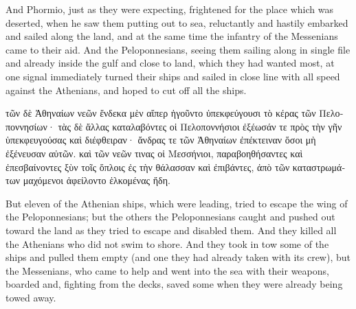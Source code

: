 \documentclass{article}
\begin{document}
And Phormio, just as they were expecting, frightened for the place which was deserted,
when he saw them putting out to sea, reluctantly and hastily embarked and sailed along the land,
and at the same time the infantry of the Messenians came to their aid.
And the Peloponnesians, seeing them sailing along in single file
and already inside the gulf and close to land, which they had wanted most,
at one signal immediately turned their ships
and sailed in close line with all speed against the Athenians,
and hoped to cut off all the ships. \\


\begin{greek}
τῶν δὲ Ἀθηναίων νεῶν ἕνδεκα μὲν αἵπερ ἡγοῦντο ὐπεκφεύγουσι τὸ κέρας τῶν Πελοποννησίων·
τὰς δὲ ἄλλας καταλαβόντες οἱ Πελοποννήσιοι ἐξέωσάν τε πρὸς τὴν γῆν ὑπεκφευγούσας καὶ διέφθειραν·
ἄνδρας τε τῶν Ἀθηναίων ἐπέκτειναν ὅσοι μὴ ἐξένευσαν αὐτῶν.
καὶ τῶν νεῶν τινας οἱ Μεσσήνιοι, παραβοηθήσαντες καὶ ἐπεσβαίνοντες ξὺν τοῖς ὅπλοις ἐς τὴν θάλασσαν καὶ ἐπιβάντες,
ἀπὸ τῶν καταστρωμάτων μαχόμενοι ἀφείλοντο ἑλκομένας ἤδη. \\
\end{greek}



But eleven of the Athenian ships, which were leading, tried to escape the wing of the Peloponnesians;
but the others the Peloponnesians caught and pushed out toward the land as they tried to escape and disabled  them.
And they killed all the Athenians who did not swim to shore.
And they took in tow some of the ships and pulled them empty (and one they had already taken with its crew),
but the Messenians, who came to help and went into the sea with their weapons,
boarded and, fighting from the decks, saved some when they were already being towed away.
\end{document}
